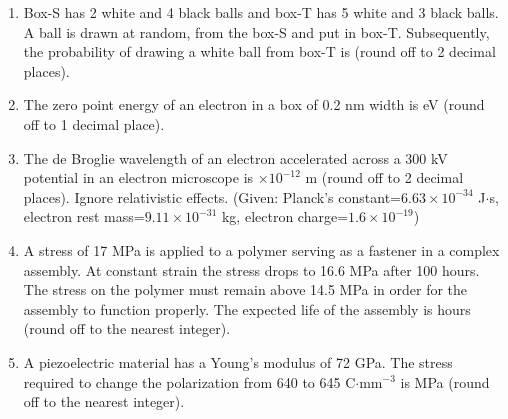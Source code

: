 \documentclass[journal,12pt,onecolumn]{IEEEtran}
\begin{document}
\begin{enumerate}[label=\arabic*)]
\vspace{0.5cm}

\item Box-S has 2 white and 4 black balls and box-T has 5 white and 3 black balls. A ball is drawn at random, from the box-S and put in box-T. Subsequently, the probability of drawing a white ball from box-T is \underline{\hspace{2cm}} (round off to 2 decimal places).
\hfill{} \\

\vspace{0.5cm}

\item The zero point energy of an electron in a box of 0.2 nm width is \underline{\hspace{2cm}} eV (round off to 1 decimal place).
\hfill{} \\

\vspace{0.5cm}

\item The de Broglie wavelength of an electron accelerated across a 300 kV potential in an electron microscope is \underline{\hspace{2cm}}$\times10^{-12}$ m (round off to 2 decimal places). Ignore relativistic effects. (Given: Planck's constant=$6.63\times10^{-34}$ J$\cdot$s, electron rest mass=$9.11\times10^{-31}$ kg, electron charge=$1.6\times10^{-19}$)
\hfill{} \\

\vspace{0.5cm}

\item A stress of 17 MPa is applied to a polymer serving as a fastener in a complex assembly. At constant strain the stress drops to 16.6 MPa after 100 hours. The stress on the polymer must remain above 14.5 MPa in order for the assembly to function properly. The expected life of the assembly is \underline{\hspace{2cm}} hours (round off to the nearest integer).
\hfill{} \\


\item A piezoelectric material has a Young's modulus of 72 GPa. The stress required to change the polarization from 640 to 645 C$\cdot$mm$^{-3}$ is \underline{\hspace{2cm}} MPa (round off to the nearest integer).
\hfill{} \\


\end{enumerate}
\end{document}
